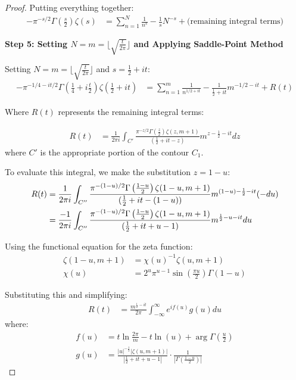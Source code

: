 \documentclass{article}
\begin{document}
\begin{proof}
Putting everything together:
\begin{align}\label{eq:integral_combined}
-\pi^{-s/2}\Gamma\left(\frac{s}{2}\right)\zeta(s) &= \sum_{n=1}^{N}\frac{1}{n^s} - \frac{1}{s}N^{-s} + \text{(remaining integral terms)}
\end{align}

\textbf{Step 5: Setting $N = m = \lfloor\sqrt{\frac{t}{2\pi}}\rfloor$ and Applying Saddle-Point Method}

Setting $N = m = \lfloor\sqrt{\frac{t}{2\pi}}\rfloor$ and $s = \frac{1}{2}+it$:
\begin{align}\label{eq:set_m}
-\pi^{-1/4-it/2}\Gamma\left(\frac{1}{4}+i\frac{t}{2}\right)\zeta\left(\frac{1}{2}+it\right) &= \sum_{n=1}^{m}\frac{1}{n^{1/2+it}} - \frac{1}{\frac{1}{2}+it}m^{-1/2-it} + R(t)
\end{align}

Where $R(t)$ represents the remaining integral terms:

\begin{align}\label{eq:R_def}
R(t) &= \frac{1}{2\pi i}\int_{C'} \frac{\pi^{-z/2}\Gamma\left(\frac{z}{2}\right)\zeta(z,m+1)}{(\frac{1}{2}+it-z)}m^{z-\frac{1}{2}-it}dz
\end{align}
where $C'$ is the appropriate portion of the contour $C_1$.

To evaluate this integral, we make the substitution $z = 1-u$:
\begin{align}
R(t) &= \frac{1}{2\pi i}\int_{C''} \frac{\pi^{-(1-u)/2}\Gamma\left(\frac{1-u}{2}\right)\zeta(1-u,m+1)}{(\frac{1}{2}+it-(1-u))}m^{(1-u)-\frac{1}{2}-it}(-du) \notag\\
&= \frac{-1}{2\pi i}\int_{C''} \frac{\pi^{-(1-u)/2}\Gamma\left(\frac{1-u}{2}\right)\zeta(1-u,m+1)}{(\frac{1}{2}+it+u-1)}m^{\frac{1}{2}-u-it}du \label{eq:R_substitution}
\end{align}

Using the functional equation for the zeta function:
\begin{align}
\zeta(1-u,m+1) &= \chi(u)^{-1} \zeta(u,m+1) \label{eq:zeta_hurwitz_func1}\\
\chi(u) &= 2^u\pi^{u-1}\sin\left(\frac{\pi u}{2}\right)\Gamma(1-u) \label{eq:zeta_hurwitz_func2}
\end{align}

Substituting this and simplifying:
\begin{align}\label{eq:R_simplified}
R(t) &= \frac{m^{\frac{1}{2}-it}}{2\pi}\int_{-\infty}^{\infty}e^{if(u)}g(u)du
\end{align}
where:
\begin{align}
f(u) &= t\ln\frac{2\pi}{m} - t\ln(u) + \arg\Gamma\left(\frac{u}{2}\right) \label{eq:f_def}\\
g(u) &= \frac{|u|^{-\frac{1}{2}}|\zeta(u,m+1)|}{|\frac{1}{2}+it+u-1|} \cdot \frac{1}{|\Gamma\left(\frac{1-u}{2}\right)|} \label{eq:g_def}
\end{align}


\end{proof}
\end{document}
